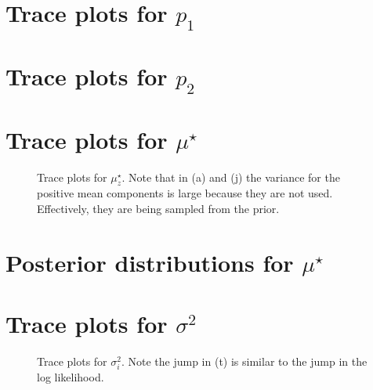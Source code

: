 \documentclass[10pt]{article} %
\begin{document}
\newpage
\section{Trace plots for $p_1$}
\begin{figure}[H]
  \begin{center}  %
  \end{center}
  \caption{}
  \label{fig:p1trace}
\end{figure}

\newpage
\section{Trace plots for $p_2$}
\begin{figure}[H]
  \begin{center}  %
  \end{center}
  \caption{}
  \label{fig:p2trace}
\end{figure}

\newpage
\section{Trace plots for $\mu^\star$}
\begin{figure}[H]
  \begin{center}  %
  \end{center}
  \caption{Trace plots for $\mu^\star_z$. Note that in (a) and (j) the variance
  for the positive mean components is large because they are not used. Effectively,
  they are being sampled from the prior.}
  \label{fig:mus-trace}
\end{figure}

\newpage
\section{Posterior distributions for $\mu^\star$}
\begin{figure}[H]
  \begin{center}  %
  \end{center}
  \caption{}
  \label{fig:mus}
\end{figure}


\newpage
\section{Trace plots for $\sigma^2$}
\begin{figure}[H]
  \begin{center}  %
  \end{center}
  \caption{Trace plots for $\sigma^2_i$. Note the jump in (t) is similar
  to the jump in the log likelihood.}
  \label{fig:sig2-trace}
\end{figure}
\end{document}
